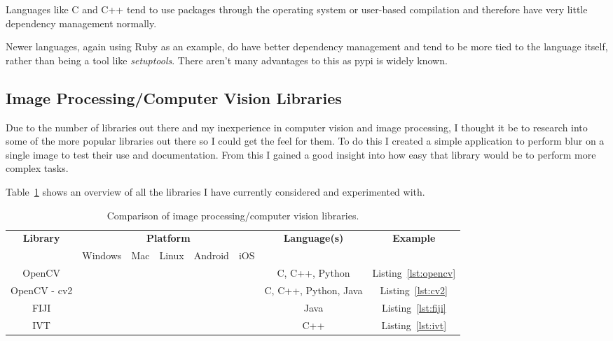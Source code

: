 Languages like C and C++ tend to use packages through the operating system or user-based 
compilation and therefore have very little dependency management normally.

Newer languages, again using Ruby as an example, do have better dependency management and tend to
be more tied to the language itself, rather than being a tool like \emph{setuptools}. There aren't
many advantages to this as \gls{pypi} is widely known.


\subsection{Image Processing/Computer Vision Libraries}
Due to the number of libraries out there and my inexperience in computer vision and image 
processing, I thought it be to research into some of the more popular libraries out there so I
could get the feel for them. To do this I created a simple application to  perform blur on a 
single image to test their use and documentation. From this I gained a good insight into how easy 
that library would be to perform more complex tasks.

Table~\ref{tab:libraries-overview} shows an overview of all the libraries I have currently 
considered and experimented with.

\begin{table}[h]
\begin{tabular}{| c | c | c | c | c | c | c | c |}
								  \hline
\multirow{2}{*}{\textbf{Library}}	& \multicolumn{5}{|c|}{\textbf{Platform}}			& \multirow{2}{*}{\textbf{Language(s)}}	& \textbf{Example}	\\\cline{2-6}
					&  Windows	& Mac 		& Linux 	& Android	& iOS	&			&			\\\hline
OpenCV					& \checkmark	& \checkmark	& \checkmark	& 		& 	& C, C++, Python	& Listing~\ref{lst:opencv}\\\hline
OpenCV - cv2				& \checkmark	& \checkmark	& \checkmark	& \checkmark	& \checkmark & C, C++, Python, Java	& Listing~\ref{lst:cv2}\\\hline
FIJI					& \checkmark	& \checkmark	& \checkmark	& 		&	& Java			& Listing~\ref{lst:fiji}	\\\hline
IVT					& \checkmark	& \checkmark	& \checkmark	& 		&	& C++			& Listing~\ref{lst:ivt}	\\\hline
\end{tabular}
\caption{Comparison of image processing/computer vision libraries.}
\label{tab:libraries-overview}
\end{table}

